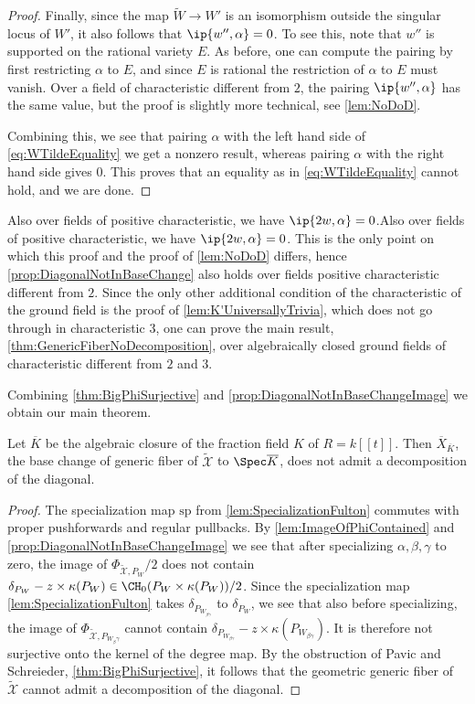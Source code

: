 \begin{proof}
Finally, since the map $\widetilde{W} \to W'$ is an isomorphism outside the singular locus of $W'$, it also follows that $\ip{w'', \alpha} = 0$. To see this, note that $w''$ is supported on the rational variety $E$. As before, one can compute the pairing by first restricting $\alpha$ to $E$, and since $E$ is rational the restriction of $\alpha$ to $E$ must vanish. Over a field of characteristic different from $2$, the pairing $\ip{w'', \alpha}$ has the same value, but the proof is slightly more technical, see \cref{lem:NoDoD}.

Combining this, we see that pairing $\alpha$ with the left hand side of \eqref{eq:WTildeEquality} we get a nonzero result, whereas pairing $\alpha$ with the right hand side gives $0$. This proves that an equality as in \eqref{eq:WTildeEquality} cannot hold, and we are done.
\end{proof}
Also over fields of positive characteristic, we have $\ip{2w, \alpha} = 0$.Also over fields of positive characteristic, we have $\ip{2w, \alpha} = 0$. This is the only point on which this proof and the proof of \cref{lem:NoDoD} differs, hence \cref{prop:DiagonalNotInBaseChange} also holds over fields positive characteristic different from $2$. Since the only other additional condition of the characteristic of the ground field is the proof of \cref{lem:K'UniversallyTrivia}, which does not go through in characteristic $3$, one can prove the main result, \cref{thm:GenericFiberNoDecomposition}, over algebraically closed ground fields of characteristic different from $2$ and $3$.

Combining \cref{thm:BigPhiSurjective} and \cref{prop:DiagonalNotInBaseChangeImage} we obtain our main theorem.
\begin{theorem}
	\label{thm:GenericFiberNoDecomposition}
	Let $\overline{K}$ be the algebraic closure of the fraction field $K$ of $R = k[[t]]$. Then $\overline{X}_{\overline{K}}$, the base change of generic fiber of $\widetilde{\mathcal{X}}$ to $\Spec \overline{K}$, does not admit a decomposition of the diagonal.
\end{theorem}
\begin{proof}
	The specialization map $\mathrm{sp}$ from \cref{lem:SpecializationFulton} commutes with proper pushforwards and regular pullbacks.
	By \cref{lem:ImageOfPhiContained} and \cref{prop:DiagonalNotInBaseChangeImage} we see that after specializing $\alpha, \beta, \gamma$ to zero, the image of $\Phi_{\widetilde{\mathcal{X}},P_W}/2$ does not contain $\delta_{P_W} - z \times \kappa(P_W) \in \CH_0(P_W \times \kappa(P_W))/2$. Since the specialization map \cref{lem:SpecializationFulton} takes $\delta_{P_{W_{\beta \gamma}}}$ to $\delta_{P_W}$, we see that also before specializing, the image of $\Phi_{\widetilde{\mathcal{X}},P_{W_\beta \gamma}}$ cannot contain $\delta_{P_{W_{\beta \gamma}}} - z \times \kappa(P_{W_{\beta \gamma}})$. It is therefore not surjective onto the kernel of the degree map. By the obstruction of Pavic and Schreieder,  \cref{thm:BigPhiSurjective}, it follows that the geometric generic fiber of $\widetilde{\mathcal{X}}$ cannot admit a decomposition of the diagonal.
\end{proof}

